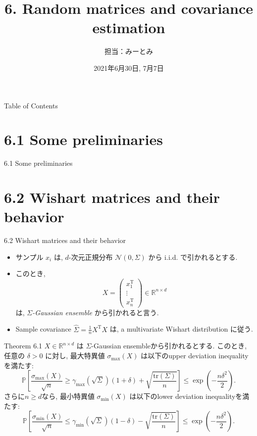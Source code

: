 \documentclass[unicode,aspectratio=169,11pt]{beamer}
\title{6. Random matrices and covariance estimation}
\author{担当：みーとみ}
\date{2021年6月30日, 7月7日}
\newcommand{\bb}{\mathbb}
\newcommand{\tr}{\mathrm{T}}
\newcommand{\trace}{\mathrm{tr}}
\begin{document}
\maketitle

\begin{frame}{Table of Contents}{}
    \tableofcontents
\end{frame}

\section{6.1 Some preliminaries}
\begin{frame}{6.1 Some preliminaries}
\end{frame}

\section{6.2 Wishart matrices and their behavior}
\begin{frame}{6.2 Wishart matrices and their behavior}
  \begin{itemize}
    \item サンプル $x_i$ は, $d$-次元正規分布 $\mathcal{N}(0, \Sigma)$ から i.i.d. で引かれるとする.
    \item このとき,
    \[
      X =
      \begin{pmatrix}
        x_1^\tr\\
        \vdots\\
        x_n^\tr
      \end{pmatrix} \in \bb{R}^{n \times d}
    \]
    は, {\it $\Sigma$-Gaussian ensemble} から引かれると言う.
    \item Sample covariance $\widehat{\Sigma} = \frac{1}{n}X^\tr X$ は, {a multivariate Wishart distribution} に従う.
  \end{itemize}
\end{frame}

\begin{frame}{}{}
  \begin{block}{Theorem 6.1}
    $X \in \mathbb{R}^{n \times d}$ は $\Sigma$-Gaussian ensembleから引かれるとする.
    このとき, 任意の $\delta > 0$ に対し, 最大特異値 $\sigma_{\max}(X)$ は以下のupper deviation inequalityを満たす:
    \[
      \bb{P} \left[
        \frac{\sigma_{\max}(X)}{\sqrt{n}}
        \ge \gamma_{\max}\left(\sqrt{\Sigma}\right) (1+\delta) + \sqrt{\frac{\trace(\Sigma)}{n}}
      \right]
      \le \exp\left(-\frac{n\delta^2}{2}\right).
      \tag{6.8}
    \]
    さらに$n \ge d$なら, 最小特異値 $\sigma_{\min}(X)$ は以下のlower deviation inequalityを満たす:
    \[
        \bb{P} \left[
        \frac{\sigma_{\min}(X)}{\sqrt{n}}
        \le \gamma_{\min}\left(\sqrt{\Sigma}\right) (1-\delta) - \sqrt{\frac{\trace(\Sigma)}{n}}
      \right]
      \le \exp\left(-\frac{n\delta^2}{2}\right).
      \tag{6.9}
    \]
  \end{block}
\end{frame}
\end{document}
